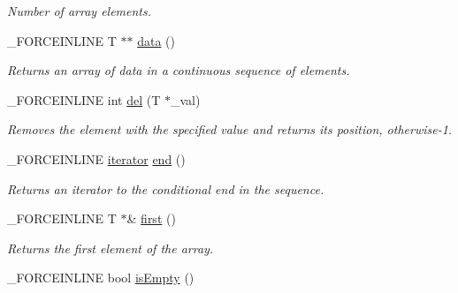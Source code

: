 \begin{DoxyCompactItemize}
\begin{DoxyCompactList}\small\item\em Number of array elements. \end{DoxyCompactList}\item 
\hypertarget{classbt_1_1_void_vector_aa786a9acda3afaf92e5d092d20cca6d5}{\-\_\-\-F\-O\-R\-C\-E\-I\-N\-L\-I\-N\-E T $\ast$$\ast$ \hyperlink{classbt_1_1_void_vector_aa786a9acda3afaf92e5d092d20cca6d5}{data} ()}\label{classbt_1_1_void_vector_aa786a9acda3afaf92e5d092d20cca6d5}

\begin{DoxyCompactList}\small\item\em Returns an array of data in a continuous sequence of elements. \end{DoxyCompactList}\item 
\hypertarget{classbt_1_1_void_vector_a95809a0fe40c3cc69fe011b1ca07c15c}{\-\_\-\-F\-O\-R\-C\-E\-I\-N\-L\-I\-N\-E int \hyperlink{classbt_1_1_void_vector_a95809a0fe40c3cc69fe011b1ca07c15c}{del} (T $\ast$\-\_\-val)}\label{classbt_1_1_void_vector_a95809a0fe40c3cc69fe011b1ca07c15c}

\begin{DoxyCompactList}\small\item\em Removes the element with the specified value and returns its position, otherwise-\/1. \end{DoxyCompactList}\item 
\hypertarget{classbt_1_1_void_vector_a69a37a5a669036db5710582d74910900}{\-\_\-\-F\-O\-R\-C\-E\-I\-N\-L\-I\-N\-E \hyperlink{classbt_1_1_void_vector_1_1iterator}{iterator} \hyperlink{classbt_1_1_void_vector_a69a37a5a669036db5710582d74910900}{end} ()}\label{classbt_1_1_void_vector_a69a37a5a669036db5710582d74910900}

\begin{DoxyCompactList}\small\item\em Returns an iterator to the conditional end in the sequence. \end{DoxyCompactList}\item 
\hypertarget{classbt_1_1_void_vector_a4012e874035a342572508aeb02d886a4}{\-\_\-\-F\-O\-R\-C\-E\-I\-N\-L\-I\-N\-E T $\ast$\& \hyperlink{classbt_1_1_void_vector_a4012e874035a342572508aeb02d886a4}{first} ()}\label{classbt_1_1_void_vector_a4012e874035a342572508aeb02d886a4}

\begin{DoxyCompactList}\small\item\em Returns the first element of the array. \end{DoxyCompactList}\item 
\hypertarget{classbt_1_1_void_vector_a6f25d15623f0ef43c9ea8cd5a8b6897a}{\-\_\-\-F\-O\-R\-C\-E\-I\-N\-L\-I\-N\-E bool \hyperlink{classbt_1_1_void_vector_a6f25d15623f0ef43c9ea8cd5a8b6897a}{is\-Empty} ()}\label{classbt_1_1_void_vector_a6f25d15623f0ef43c9ea8cd5a8b6897a}


\end{DoxyCompactItemize}
